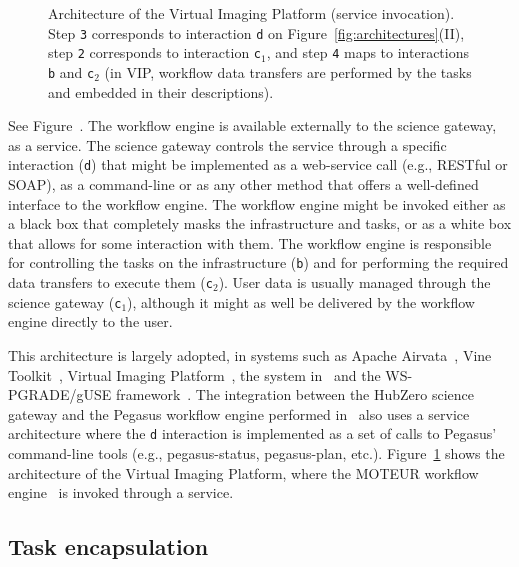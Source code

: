 \documentclass[preprint,3p,twocolumn]{elsarticle}
\newcommand{\note}[2]{\pdfmargincomment[color=yellow,author=#1,open=true]{#2}}
\newcommand{\closednote}[4]{} %
\begin{document}
\begin{figure}
\centering
\def\svgwidth{1.5\columnwidth}

\caption{Architecture of the Virtual Imaging Platform (service
  invocation).  Step \texttt{3} corresponds to interaction \texttt{d}
  on Figure~\ref{fig:architectures}(II), step \texttt{2} corresponds to
  interaction \texttt{c$_1$}, and step \texttt{4} maps to interactions
  \texttt{b} and \texttt{c$_2$} (in VIP, workflow data transfers are
  performed by the tasks and embedded in their descriptions).}
\label{fig:vip-architecture}
\end{figure}

See Figure~. The workflow engine is available
externally to the science gateway, as a service. The science gateway
controls the service through a specific interaction (\texttt{d}) that
might be implemented as a web-service call (e.g., RESTful or SOAP), as
a command-line or as any other method that offers a well-defined
interface to the workflow engine. The workflow engine might be invoked
either as a black box that completely masks the infrastructure and
tasks, or as a white box that allows for some interaction with
them. The workflow engine is responsible for controlling the tasks on
the infrastructure (\texttt{b}) and for performing the required data
transfers to execute them (\texttt{c$_2$}). User data is usually
managed through the science gateway (\texttt{c$_1$}), although it
might as well be delivered by the workflow engine directly to the
user.

This architecture is largely adopted, in systems such as Apache
Airvata~\cite{marru2011apache}, Vine
Toolkit~\cite{DBLP:journals/scpe/SzejnfeldDKKKKLPTWDNW10}, Virtual
Imaging Platform~\cite{GLAT-13}, the system
in~\cite{wu2010accelerating} and the WS-PGRADE/gUSE
framework~\cite{Kacsuk2012}. The integration between the
HubZero science gateway and the Pegasus workflow engine performed
in~\cite{CPE:CPE3257} also uses a service architecture where the
\texttt{d} interaction is implemented as a set of calls to Pegasus'
command-line tools (e.g., pegasus-status, pegasus-plan,
etc.). Figure~\ref{fig:vip-architecture} shows the architecture of the
Virtual Imaging Platform, where the MOTEUR workflow
engine~\cite{GLAT-08i} is invoked through a service.

\subsection{Task encapsulation}
\closednote{Marc-e}{May I propose
  another name here? Either "Task-centric" or "Task Oriented". My
  reasoning is that the WE is just another task, as well as the
  sub-tasks themselves.}{Tristan}{I agree: sub-tasking is not the
  integration model, it is the process that engines use when they
  are integrated as tasks. I think 'task encapsulation' is more
  consistent  with 'service invocation' than 'task-oriented'}
\end{document}
